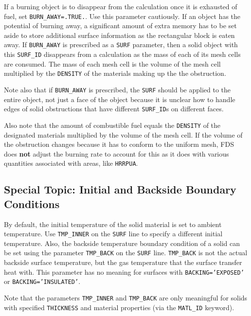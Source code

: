 \documentclass[11pt]{book}
\newcommand{\ct}{\tt\small}
\begin{document}
If a burning object is to disappear from the
calculation once it is exhausted of fuel, set {\ct BURN\_AWAY=.TRUE.}.
Use this parameter cautiously. If an object has the potential of
burning away, a significant amount of extra memory has to be set aside
to store additional surface information as the rectangular block is
eaten away. If {\ct BURN\_AWAY} is prescribed as a {\ct SURF} parameter, then a solid
object with this {\ct SURF\_ID} disappears from a calculation as
the mass of each of its mesh cells are consumed. The mass of each mesh
cell is the volume of the mesh cell multiplied by the {\ct DENSITY} of the
materials making up the the obstruction.

\begin{warning}
\noindent
Note also that if {\ct BURN\_AWAY} is prescribed, the {\ct SURF} should be applied to the
entire object, not just a face of the object because it is unclear how to handle edges
of solid obstructions that have different {\ct SURF\_ID}s on different faces.
\end{warning}

\noindent
Also note that the amount of combustible fuel equals the {\ct DENSITY} of the designated materials
multiplied by the volume of the mesh cell. If the volume of the obstruction changes because it has
to conform to the uniform mesh, FDS does {\bf not} adjust the burning rate to account for this as
it does with various quantities associated with areas, like {\ct HRRPUA}.

\subsection{Special Topic: Initial and Backside Boundary Conditions}
By default, the initial temperature of the solid material is set to
ambient temperature. Use {\ct TMP\_INNER} on the {\ct SURF} line to
specify a different initial temperature.
Also, the backside temperature boundary condition of a solid can be
set using the parameter {\ct TMP\_BACK} on the {\ct SURF}
line. {\ct TMP\_BACK} is not the actual backside surface temperature,
but the gas temperature that the surface transfer heat with. This
parameter has no meaning for surfaces with {\ct BACKING='EXPOSED'} or
{\ct BACKING='INSULATED'}.

\begin{warning}
\noindent
Note that the parameters {\ct TMP\_INNER} and {\ct TMP\_BACK} are only meaningful for solids with specified {\ct THICKNESS} and material
properties (via the {\ct MATL\_ID} keyword).
\end{warning}
\end{document}
